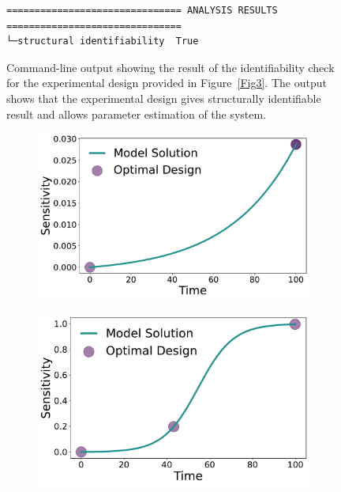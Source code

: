 \documentclass[graybox]{svmult}
\begin{document}
%
\begin{figure}
    \begin{verbatim}
=============================== ANALYSIS RESULTS ===============================
└─structural identifiability  True
    \end{verbatim}
    \caption{Command-line output showing the result of the identifiability check for the experimental design provided in Figure~\ref{Fig3}.
    The output shows that the experimental design gives structurally identifiable result and allows parameter estimation of the system.}
    \label{Fig6}
\end{figure}
%
%
\begin{figure}[H]
    \begin{subfigure}{.5\textwidth}
      \centering
      \includegraphics[scale=0.25]{Figures/Fig7a.pdf}
    \end{subfigure}
    \begin{subfigure}{.5\textwidth}
        \centering
        \includegraphics[scale=0.25]{Figures/Fig7b.pdf}

\end{subfigure}
\end{figure}
\end{document}
